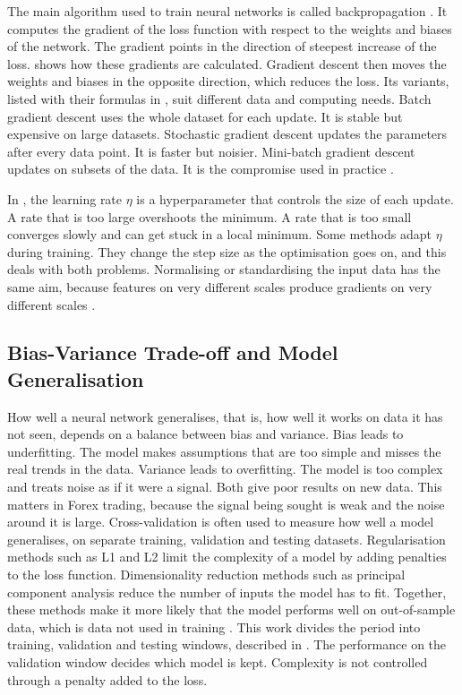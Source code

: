 

The main algorithm used to train neural networks is called backpropagation \cite{rumelhart_learning_1986}. It computes the gradient of the loss function with respect to the weights and biases of the network. The gradient points in the direction of steepest increase of the loss.  shows how these gradients are calculated. Gradient descent then moves the weights and biases in the opposite direction, which reduces the loss. Its variants, listed with their formulas in , suit different data and computing needs. Batch gradient descent uses the whole dataset for each update. It is stable but expensive on large datasets. Stochastic gradient descent updates the parameters after every data point. It is faster but noisier. Mini-batch gradient descent updates on subsets of the data. It is the compromise used in practice \cite{goodfellow_deep_2016}.



In , the learning rate \( \eta \) is a hyperparameter that controls the size of each update. A rate that is too large overshoots the minimum. A rate that is too small converges slowly and can get stuck in a local minimum. Some methods adapt \( \eta \) during training. They change the step size as the optimisation goes on, and this deals with both problems. Normalising or standardising the input data has the same aim, because features on very different scales produce gradients on very different scales \cite{goodfellow_deep_2016}.



\subsection{Bias-Variance Trade-off and Model Generalisation}

How well a neural network generalises, that is, how well it works on data it has not seen, depends on a balance between bias and variance. Bias leads to underfitting. The model makes assumptions that are too simple and misses the real trends in the data. Variance leads to overfitting. The model is too complex and treats noise as if it were a signal. Both give poor results on new data. This matters in Forex trading, because the signal being sought is weak and the noise around it is large. Cross-validation is often used to measure how well a model generalises, on separate training, validation and testing datasets. Regularisation methods such as L1 and L2 limit the complexity of a model by adding penalties to the loss function. Dimensionality reduction methods such as principal component analysis reduce the number of inputs the model has to fit. Together, these methods make it more likely that the model performs well on out-of-sample data, which is data not used in training \cite{goodfellow_deep_2016}. This work divides the period into training, validation and testing windows, described in . The performance on the validation window decides which model is kept. Complexity is not controlled through a penalty added to the loss.

